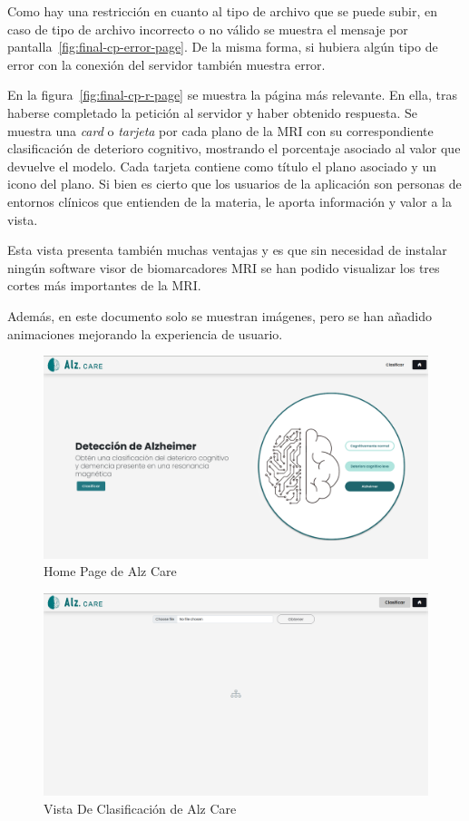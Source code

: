 Como hay una restricción en cuanto al tipo de archivo que se puede subir, en caso de tipo de archivo incorrecto o no
válido se muestra el mensaje por pantalla~\ref{fig:final-cp-error-page}.
De la misma forma, si hubiera algún tipo de error con la conexión del servidor también muestra error.

En la figura~\ref{fig:final-cp-r-page} se muestra la página más relevante.
En ella, tras haberse completado la petición al servidor y haber obtenido respuesta.
Se muestra una \textit{card} o \textit{tarjeta} por cada plano de la MRI con su correspondiente clasificación de
deterioro cognitivo, mostrando el porcentaje asociado al valor que devuelve el modelo.
Cada tarjeta contiene como título el plano asociado y un icono del plano.
Si bien es cierto que los usuarios de la aplicación son personas de entornos clínicos que entienden de la materia,
le aporta información y valor a la vista.

Esta vista presenta también muchas ventajas y es que sin necesidad de instalar ningún software visor de biomarcadores
MRI se han podido visualizar los tres cortes más importantes de la MRI.

Además, en este documento solo se muestran imágenes, pero se han añadido animaciones mejorando la experiencia de usuario.

\begin{figure}[H]
    \centering
    \includegraphics[width=\textwidth]{./imgs/app/final-home}
    \caption{Home Page de Alz Care}
    \label{fig:home-page}
\end{figure}

\begin{figure}[H]
    \centering
    \includegraphics[width=\textwidth]{./imgs/app/final-cp}
    \caption{Vista De Clasificación de Alz Care}
    \label{fig:final-cp-page}
\end{figure}

